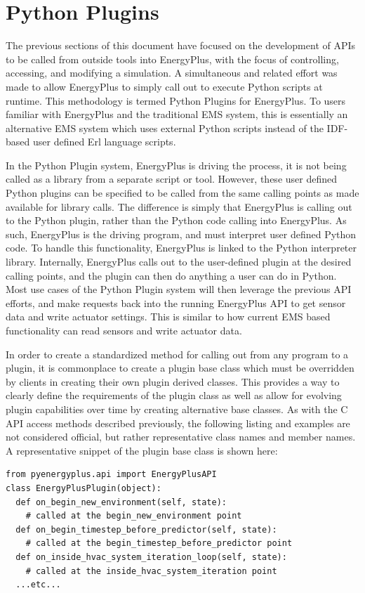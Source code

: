 \documentclass[5p, authoryear]{elsarticle}
\begin{document}
 \section{Python Plugins}
The previous sections of this document have focused on the development of APIs to be called from outside tools into EnergyPlus, with the focus of controlling, accessing, and modifying a simulation.  A simultaneous and related effort was made to allow EnergyPlus to simply call out to execute Python scripts at runtime.  This methodology is termed Python Plugins for EnergyPlus.  To users familiar with EnergyPlus and the traditional EMS system, this is essentially an alternative EMS system which uses external Python scripts instead of the IDF-based user defined Erl language scripts.

In the Python Plugin system, EnergyPlus is driving the process, it is not being called as a library from a separate script or tool.  However, these user defined Python plugins can be specified to be called from the same calling points as made available for library calls.  The difference is simply that EnergyPlus is calling out to the Python plugin, rather than the Python code calling into EnergyPlus.  As such, EnergyPlus is the driving program, and must interpret user defined Python code.  To handle this functionality, EnergyPlus is linked to the Python interpreter library.    Internally, EnergyPlus calls out to the user-defined plugin at the desired calling points, and the plugin can then do anything a user can do in Python.  Most use cases of the Python Plugin system will then leverage the previous API efforts, and make requests back into the running EnergyPlus API to get sensor data and write actuator settings.  This is similar to how current EMS based functionality can read sensors and write actuator data.

In order to create a standardized method for calling out from any program to a plugin, it is commonplace to create a plugin base class which must be overridden by clients in creating their own plugin derived classes.  This provides a way to clearly define the requirements of the plugin class as well as allow for evolving plugin capabilities over time by creating alternative base classes.  As with the C API access methods described previously, the following listing and examples are not considered official, but rather representative class names and member names.  A representative snippet of the plugin base class is shown here:

\lstset{language=python}
\begin{lstlisting}
from pyenergyplus.api import EnergyPlusAPI
class EnergyPlusPlugin(object):
  def on_begin_new_environment(self, state):
    # called at the begin_new_environment point
  def on_begin_timestep_before_predictor(self, state):
    # called at the begin_timestep_before_predictor point
  def on_inside_hvac_system_iteration_loop(self, state):
    # called at the inside_hvac_system_iteration point
  ...etc...
\end{lstlisting}
\end{document}
